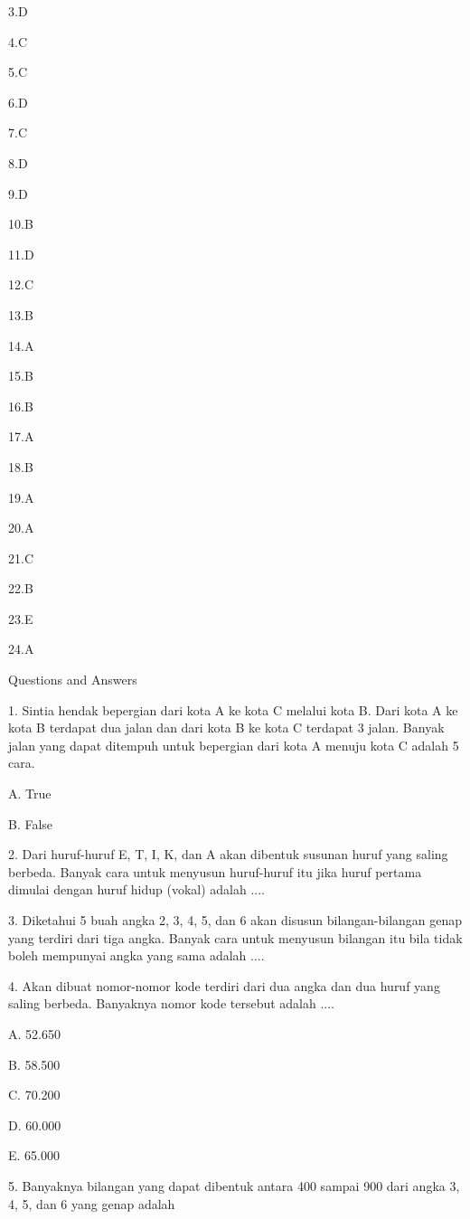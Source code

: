 \documentclass[11pt,fleqn]{book} %
\begin{document}
3.D

4.C

5.C

6.D

7.C

8.D

9.D

10.B

11.D

12.C

13.B

14.A

15.B

16.B

17.A

18.B

19.A

20.A

21.C

22.B

23.E

24.A





Questions and Answers




1. 
Sintia hendak bepergian dari kota A ke kota C melalui kota B. Dari kota A ke kota B terdapat dua jalan dan dari kota B ke kota C terdapat 3 jalan. Banyak jalan yang dapat ditempuh untuk bepergian dari kota A menuju kota C adalah 5 cara.

A. 
True

B. 
False

2. 
Dari huruf-huruf E, T, I, K, dan A akan dibentuk susunan huruf yang saling berbeda. Banyak cara untuk menyusun huruf-huruf itu jika huruf pertama dimulai dengan huruf hidup (vokal) adalah ....

3. 
Diketahui 5 buah angka 2, 3, 4, 5, dan 6 akan disusun bilangan-bilangan genap yang terdiri dari tiga angka. Banyak cara untuk menyusun bilangan itu bila tidak boleh mempunyai angka yang sama adalah ....

4. 
Akan dibuat nomor-nomor kode terdiri dari dua angka dan dua huruf yang saling berbeda. Banyaknya nomor kode tersebut adalah ....

A. 
52.650

B. 
58.500

C. 
70.200

D. 
60.000

E. 
65.000

5. 
Banyaknya bilangan yang dapat dibentuk antara 400 sampai 900 dari angka 3, 4, 5, dan 6 yang genap adalah
\end{document}
